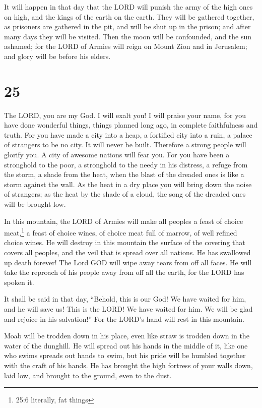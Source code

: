  It will happen in that day that the LORD will punish the
army of the high ones on high, and the kings of the earth on the earth.
 They will be gathered together, as prisoners are gathered
in the pit, and will be shut up in the prison; and after many days they
will be visited.  Then the moon will be confounded, and the
sun ashamed; for the LORD of Armies will reign on Mount Zion and in
Jerusalem; and glory will be before his elders.

\hypertarget{section-24}{%
\section{25}\label{section-24}}

 The LORD, you are my God. I will exalt you! I will praise
your name, for you have done wonderful things, things planned long ago,
in complete faithfulness and truth.  For you have made a
city into a heap, a fortified city into a ruin, a palace of strangers to
be no city. It will never be built.  Therefore a strong
people will glorify you. A city of awesome nations will fear you.
 For you have been a stronghold to the poor, a stronghold to
the needy in his distress, a refuge from the storm, a shade from the
heat, when the blast of the dreaded ones is like a storm against the
wall.  As the heat in a dry place you will bring down the
noise of strangers; as the heat by the shade of a cloud, the song of the
dreaded ones will be brought low.

 In this mountain, the LORD of Armies will make all peoples
a feast of choice meat,\footnote{25:6 literally, fat things} a feast of
choice wines, of choice meat full of marrow, of well refined choice
wines.  He will destroy in this mountain the surface of the
covering that covers all peoples, and the veil that is spread over all
nations.  He has swallowed up death forever! The Lord GOD
will wipe away tears from off all faces. He will take the reproach of
his people away from off all the earth, for the LORD has spoken it.

 It shall be said in that day, ``Behold, this is our God! We
have waited for him, and he will save us! This is the LORD! We have
waited for him. We will be glad and rejoice in his salvation!''
 For the LORD's hand will rest in this mountain.

Moab will be trodden down in his place, even like straw is trodden down
in the water of the dunghill.  He will spread out his hands
in the middle of it, like one who swims spreads out hands to swim, but
his pride will be humbled together with the craft of his hands.
 He has brought the high fortress of your walls down, laid
low, and brought to the ground, even to the dust.

